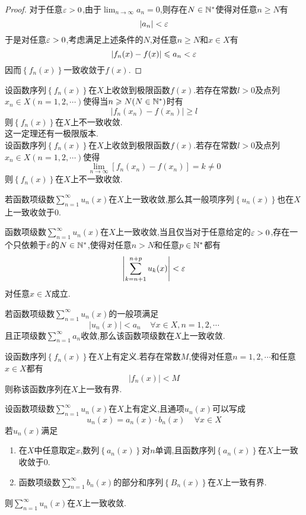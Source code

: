 \documentclass{ctexart}
\begin{document}
\begin{proof}
    对于任意$\varepsilon>0$,由于$\displaystyle\lim_{n\to\infty}a_n=0$,则存在$N\in\mathbb{N}^*$使得对任意$n\geqslant N$有
    \[\left|a_n\right|<\varepsilon\]
    于是对任意$\varepsilon>0$,考虑满足上述条件的$N$,对任意$n\geqslant N$和$x\in X$有
    \[\left|f_n(x)-f(x)\right|\leqslant a_n<\varepsilon\]
    因而$\left\{f_n\left(x\right)\right\}$一致收敛于$f(x)$.
\end{proof}
\begin{formal}[2.4 不一致收敛的判据I]
    设函数序列$\left\{f_n(x)\right\}$在$X$上收敛到极限函数$f(x)$.若存在常数$l>0$及点列$x_n\in X(n=1,2,\cdots)$使得当$n\geqslant N(N\in\mathbb{N}^*)$时有
    \[\left|f_n(x_n)-f(x_n)\right|\geqslant l\]
    则$\left\{f_n(x)\right\}$在$X$上不一致收敛.\\
    这一定理还有一极限版本.\\
    设函数序列$\left\{f_n(x)\right\}$在$X$上收敛到极限函数$f(x)$.若存在常数$l>0$及点列$x_n\in X(n=1,2,\cdots)$使得
    \[\lim_{n\to\infty}\left[f_n(x_n)-f(x_n)\right]=k\neq0\]
    则$\left\{f_n(x)\right\}$在$X$上不一致收敛.
\end{formal}
\noindent{}
\begin{formal}[3.1]
    若函数项级数$\displaystyle\sum_{n=1}^\infty u_n(x)$在$X$上一致收敛,那么其一般项序列$\left\{u_n(x)\right\}$也在$X$上一致收敛于$0$.
\end{formal}
\begin{formal}[3.2 一致收敛的Cauchy准则]
    函数项级数$\displaystyle\sum_{n=1}^\infty u_n(x)$在$X$上一致收敛,当且仅当对于任意给定的$\varepsilon>0$,存在一个只依赖于$\varepsilon$的$N\in\mathbb{N}^*$,使得对任意$n>N$和任意$p\in\mathbb{N}^*$都有
    \[\left|\sum_{k=n+1}^{n+p}u_k(x)\right|<\varepsilon\]
    对任意$x\in X$成立.
\end{formal}
\begin{formal}
    若函数项级数$\displaystyle\sum_{n=1}^\infty u_n(x)$的一般项满足
    \[\left|u_n(x)\right|<a_n\ \ \ \ \ \forall x\in X,n=1,2,\cdots\]
    且正项级数$\displaystyle\sum_{n=1}^\infty a_n$收敛,那么该函数项级数在$X$上一致收敛.
\end{formal}
\begin{definition}[3.4 一致有界]
    设函数序列$\left\{f_n(x)\right\}$在$X$上有定义.若存在常数$M$,使得对任意$n=1,2,\cdots$和任意$x\in X$都有
    \[\left|f_n(x)\right|<M\]
    则称该函数序列在$X$上一致有界.
\end{definition}
\begin{formal}[3.5 Dirichlet判别法]
    设函数项级数$\displaystyle\sum_{n=1}^\infty u_n(x)$在$X$上有定义,且通项$u_n(x)$可以写成
    \[u_n(x)=a_n(x)\cdot b_n(x)\ \ \ \ \ \forall x\in X\]
    若$u_n(x)$满足
    \begin{enumerate}[label=\tbf{\arabic*.}]
        \item 在$X$中任意取定$x$,数列$\left\{a_n(x)\right\}$对$n$单调,且函数序列$\left\{a_n(x)\right\}$在$X$上一致收敛于$0$.
        \item 函数项级数$\displaystyle\sum_{n=1}^{\infty}b_n(x)$的部分和序列$\left\{B_n(x)\right\}$在$X$上一致有界.
    \end{enumerate}
    则$\displaystyle\sum_{n=1}^\infty u_n(x)$在$X$上一致收敛.
\end{formal}\noindent
\end{document}
